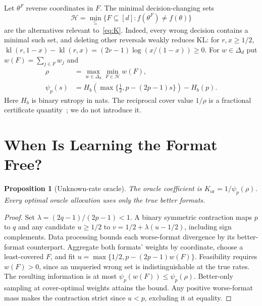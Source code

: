 \documentclass[sigconf,anonymous,review]{acmart}
\newtheorem{proposition}[theorem]{Proposition}
\newcommand{\kl}{\operatorname{kl}}
\newcommand{\Kor}{K_{\mathrm{or}}}
\newcommand{\cH}{\mathcal H}
\begin{document}
Let $\theta^F$ reverse coordinates in $F$. The minimal decision-changing sets
\begin{equation}\label{eq:H}
 \cH=\min_{\subseteq}\{F\subseteq[d]:f(\theta^F)\ne f(\theta)\}
\end{equation}
are the alternatives relevant to~\eqref{eq:K}. Indeed, every wrong decision contains a minimal such set, and deleting other reversals weakly reduces KL: for $r,x\ge1/2$,
$\kl(r,1-x)-\kl(r,x)=(2r-1)\log(x/(1-x))\ge0$.
For $w\in\Delta_d$ put $w(F)=\sum_{j\in F}w_j$ and
\begin{equation}\label{eq:rho}
 \begin{split}
 \rho&=\max_{w\in\Delta_d}\min_{F\in\cH}w(F),\\
 \psi_p(s)&=H_b\!\left(\max\{\tfrac12,p-(2p-1)s\}\right)-H_b(p).
 \end{split}
\end{equation}
Here $H_b$ is binary entropy in nats. The reciprocal cover value $1/\rho$ is a fractional certificate quantity~\cite{kulkarni2013}; we do not introduce it.

\section{When Is Learning the Format Free?}
\begin{proposition}[Unknown-rate oracle]\label{prop:oracle}
The oracle coefficient is $\Kor=1/\psi_p(\rho)$. Every optimal oracle allocation uses only the true better formats.
\end{proposition}
\begin{proof}
Set $\lambda=(2q-1)/(2p-1)<1$. A binary symmetric contraction maps $p$ to $q$ and any candidate $u\ge1/2$ to $v=1/2+\lambda(u-1/2)$, including sign complements. Data processing bounds each worse-format divergence by its better-format counterpart. Aggregate both formats' weights by coordinate, choose a least-covered $F$, and fit $u=\max\{1/2,p-(2p-1)w(F)\}$. Feasibility requires $w(F)>0$, since an unqueried wrong set is indistinguishable at the true rates. The resulting information is at most $\psi_p(w(F))\le\psi_p(\rho)$. Better-only sampling at cover-optimal weights attains the bound. Any positive worse-format mass makes the contraction strict since $u<p$, excluding it at equality.
\end{proof}
\end{document}
